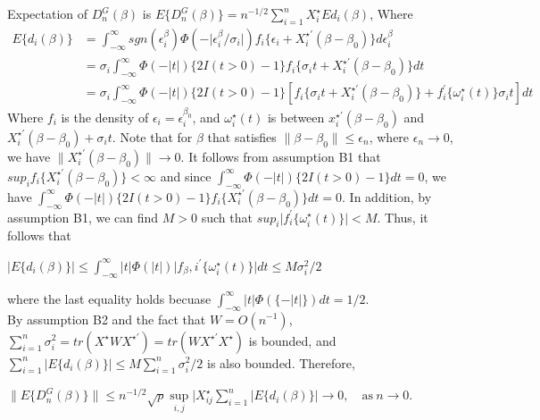 \documentclass[12pt]{article}
\begin{document}
	\noindent Expectation of $D_n^G(\beta)$ is
	$E\{D_n^G(\beta)\}=n^{-1/2}\sum_{i=1}^{n}X_i^\star E{d_i(\beta)}$,
	\noindent Where 
	\begin{align*}
	E\{d_i(\beta)\} & = \int_{-\infty}^{\infty}sgn(\epsilon_i^\beta)\Phi(-\lvert\epsilon_i^\beta/\sigma_i\rvert)f_i\{\epsilon_i+X_i^{\star \prime}(\beta-\beta_0)\}d\epsilon_i^\beta\\
	& = \sigma_i \int_{-\infty}^{\infty}\Phi(-\lvert t \rvert)\{2I(t>0)-1\}f_i\{\sigma_i t + X_i^{\star \prime}(\beta-\beta_0)\}dt\\
	& = \sigma_i \int_{-\infty}^{\infty}\Phi(-\lvert t \rvert)\{2I(t>0)-1\}[f_i\{\sigma_i t + X_i^{\star \prime}(\beta-\beta_0)\}+f_i^\prime\{\omega_i^\star(t)\}\sigma_i t]dt
	\end{align*}
	\noindent Where $f_i$ is the density of $\epsilon_i=\epsilon_i^{\beta_0}$, and $\omega_i^\star(t)$ is between $x_i^{\star \prime} (\beta-\beta_0)$ and $X_i^{\star \prime} (\beta-\beta_0)+\sigma_i t$. Note that for $\beta$ that satisfies $\lVert \beta-\beta_0 \rVert \leq \epsilon_n$, where $\epsilon_n \to 0$, we have $\lVert X_i^{\star \prime} (\beta-\beta_0) \rVert \to 0$. It follows from assumption B1 that $sup_i f_i \{X_i^{\star \prime} (\beta-\beta_0)\}<\infty$ and since $\int_{-\infty}^{\infty} \Phi(-\lvert t \rvert)\{2I(t>0)-1\}dt=0$, we have $\int_{-\infty}^{\infty} \Phi(-\lvert t \rvert)\{2I(t>0)-1\}f_i \{X_i^{\star \prime} (\beta-\beta_0)\}dt=0$. In addition, by assumption B1, we can find $M>0$ such that $sup_i \lvert f_i^\prime \{\omega_i^\star (t)\}\rvert<M$. Thus, it follows that\\
	
	\begin{center}
	$\lvert E\{d_i(\beta)\} \rvert \leq \int_{-\infty}^{\infty} \lvert t \rvert \Phi(\lvert t \rvert) \lvert f_\beta, i ^\prime \{\omega_i^\star(t)\}\rvert dt \leq M \sigma_i^2 /2$
	\end{center}
	
	\noindent where the last equality holds becuase $\int_{-\infty}^{\infty} \lvert t \rvert \Phi (\{-\lvert t \rvert\})dt=1/2$.\\
	
	\noindent By assumption B2 and the fact that $W=O(n^{-1})$, $\sum_{i=1}^{n} \sigma_i^2=tr(X^\star W X^{\star \prime})=tr(W X^{\star \prime}X^\star)$ is bounded, and $\sum_{i=1}^{n} \lvert E\{d_i(\beta)\} \rvert \leq M \sum_{i=1}^{n}\sigma_i^2 /2$ is also bounded. Therefore,
	
	\begin{center}
	$\lVert E\{D_n^G(\beta)\} \rVert \leq n^{-1/2} \sqrt{p} \sup\limits_{i,j} \lvert X_{ij}^{\star} \sum_{i=1}^{n} \lvert E\{d_i(\beta)\} \rvert \to 0,\quad \text{as}\ n\to 0.$
	\end{center}
	
\end{document}
